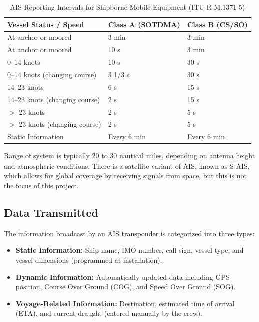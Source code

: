 \begin{table}[h!]
\centering
\caption{AIS Reporting Intervals for Shipborne Mobile Equipment (ITU-R M.1371-5)}
\label{tab:ais_reporting_rates}
\begin{tabular}{|l|l|l|}
\hline
\textbf{Vessel Status / Speed} & \textbf{Class A (SOTDMA)} & \textbf{Class B (CS/SO)} \\ \hline
At anchor or moored & 3 min & 3 min \\ \hline
At anchor or moored & 10 s & 3 min \\ \hline
0--14 knots & 10 s & 30 s \\ \hline
0--14 knots (changing course) & 3 1/3 s & 30 s \\ \hline
14--23 knots & 6 s & 15 s \\ \hline
14--23 knots (changing course) & 2 s & 15 s \\ \hline
$>$ 23 knots & 2 s & 5 s \\ \hline
$>$ 23 knots (changing course) & 2 s & 5 s \\ \hline
Static Information & Every 6 min & Every 6 min \\ \hline
\end{tabular}
\end{table}


\vspace{0.5cm}

Range of system is typically 20 to 30 nautical miles, depending on antenna height and atmospheric conditions. There is a satellite variant of AIS, known as S-AIS, which allows for global coverage by receiving signals from space, but this is not the focus of this project.

\subsection{Data Transmitted}
\label{subsection:data_tx}

The information broadcast by an AIS transponder is categorized into three types:

\begin{itemize}
    \item \textbf{Static Information:} Ship name, IMO number, call sign, vessel type, and vessel dimensions (programmed at installation).
    \item \textbf{Dynamic Information:} Automatically updated data including GPS position, Course Over Ground (COG), and Speed Over Ground (SOG).
    \item \textbf{Voyage-Related Information:} Destination, estimated time of arrival (ETA), and current draught (entered manually by the crew).
\end{itemize}


